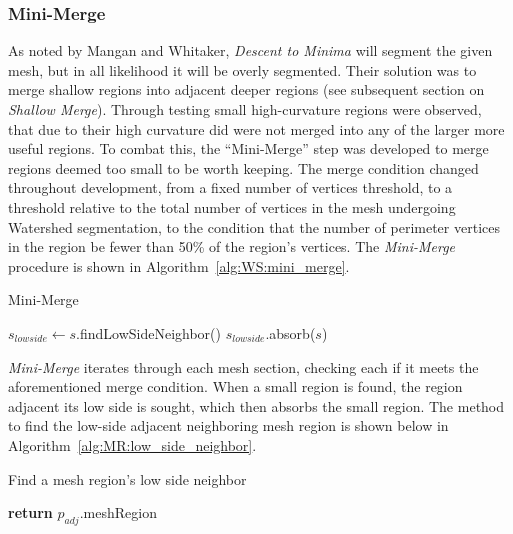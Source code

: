 \subsubsection{Mini-Merge}
As noted by Mangan and Whitaker, \textit{Descent to Minima} will segment the given mesh, but in all likelihood it will be overly segmented.
Their solution was to merge shallow regions into adjacent deeper regions (see subsequent section on \textit{Shallow Merge}).
Through testing small high-curvature regions were observed, that due to their high curvature did were not merged into any of the larger more useful regions.
To combat this, the ``Mini-Merge'' step was developed to merge regions deemed too small to be worth keeping.
The merge condition changed throughout development, from a fixed number of vertices threshold, to a threshold relative to the total number of vertices in the mesh undergoing Watershed segmentation, to the condition that the number of perimeter vertices in the region be fewer than 50\% of the region's vertices.
The \textit{Mini-Merge} procedure is shown in Algorithm~\ref{alg:WS:mini_merge}.

\begin{algorithm}[htb]
\caption{Mini-Merge}\label{alg:WS:mini_merge}
\begin{algorithmic}[1]
			\State $s_{lowside} \leftarrow s$.findLowSideNeighbor()
			\State $s_{lowside}$.absorb($s$)
		\EndIf
	\EndFor
\EndFunction
\end{algorithmic}
\end{algorithm}

\textit{Mini-Merge} iterates through each mesh section, checking each if it meets the aforementioned merge condition.
When a small region is found, the region adjacent its low side is sought, which then absorbs the small region.
The method to find the low-side adjacent neighboring mesh region is shown below in Algorithm~\ref{alg:MR:low_side_neighbor}.

\begin{algorithm}[htb]
\caption{Find a mesh region's low side neighbor}\label{alg:MR:low_side_neighbor}
\begin{algorithmic}[1]
				\State \textbf{return} $p_{adj}$.meshRegion
			\EndIf
		\EndFor
	\EndFor
\EndFunction
\end{algorithmic}
\end{algorithm}

